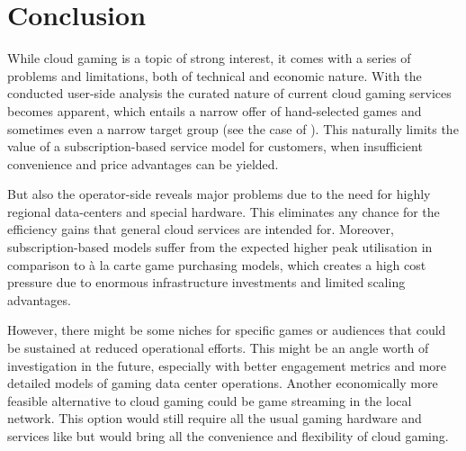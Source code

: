 \section{Conclusion}
\label{sec:conclusion}

While cloud gaming is a topic of strong interest, it comes with a series of problems and limitations, both of technical and economic nature. With the conducted user-side analysis the curated nature of current cloud gaming services becomes apparent, which entails a narrow offer of hand-selected games and sometimes even a narrow target group (see the case of \psnow). This naturally limits the value of a subscription-based service model for customers, when insufficient convenience and price advantages can be yielded.


But also the operator-side reveals major problems due to the need for highly regional data-centers and special hardware. This eliminates any chance for the efficiency gains that general cloud services are intended for. Moreover, subscription-based models suffer from the expected higher peak utilisation in comparison to à la carte game purchasing models, which creates a high cost pressure due to enormous infrastructure investments and limited scaling advantages. 

However, there might be some niches for specific games or audiences that could be sustained at reduced operational efforts. This might be an angle worth of investigation in the future, especially with better engagement metrics and more detailed models of gaming data center operations. Another economically more feasible alternative to cloud gaming could be game streaming in the local network. This option would still require all the usual gaming hardware and services like \steam but would bring all the convenience and flexibility of cloud gaming.
